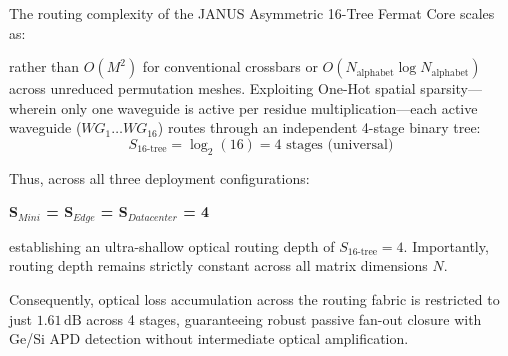 \documentclass[journal]{IEEEtran}
\begin{document}
The routing complexity of the JANUS Asymmetric 16-Tree Fermat Core scales as:
\begin{center}
\end{center}

rather than $O(M^2)$ for conventional crossbars or $O(N_{\mathrm{alphabet}} \log N_{\mathrm{alphabet}})$ across unreduced permutation meshes. Exploiting One-Hot spatial sparsity---wherein only one waveguide is active per residue multiplication---each active waveguide ($WG_1 \dots WG_{16}$) routes through an independent 4-stage binary tree:
\begin{equation}
S_{\mathrm{16\text{-}tree}} = \log_2(16) = 4 \text{ stages (universal)}
\end{equation}

Thus, across all three deployment configurations:
\begin{center}
\textbf{S$_{Mini}$ = S$_{Edge}$ = S$_{Datacenter}$ = 4}
\end{center}

establishing an ultra-shallow optical routing depth of $S_{\mathrm{16\text{-}tree}} = 4$. Importantly, routing depth remains strictly constant across all matrix dimensions $N$.

Consequently, optical loss accumulation across the routing fabric is restricted to just $1.61\,\mathrm{dB}$ across 4 stages, guaranteeing robust passive fan-out closure with Ge/Si APD detection without intermediate optical amplification.
\end{document}
